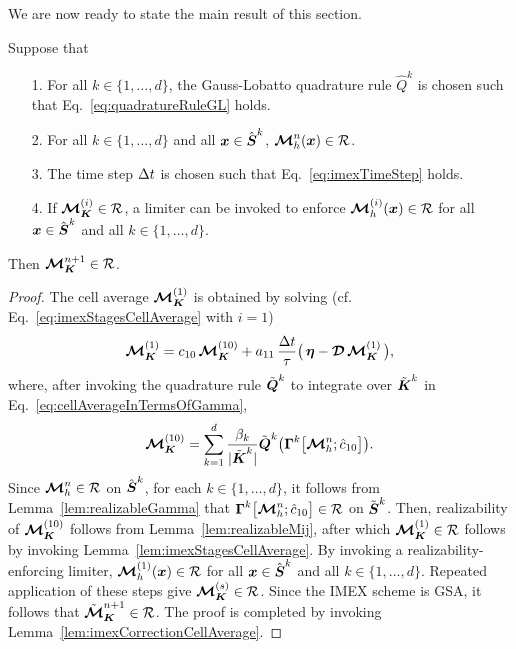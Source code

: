 We are now ready to state the main result of this section.  
\begin{theorem}
  Suppose that
  \begin{itemize}
    \item[1.] For all $k\in\{1,\ldots,d\}$, the Gauss-Lobatto quadrature rule $\hat{Q}^{k}$ is chosen such that Eq.~\eqref{eq:quadratureRuleGL} holds.  
    \item[2.] For all $k\in\{1,\ldots,d\}$ and all $\boldsymbol{x}\in\hat{\boldsymbol{S}}^{k}$, $\boldsymbol{\mathcal{M}}_{h}^{n}(\boldsymbol{x})\in\mathcal{R}$.
    \item[3.] The time step $\Delta t$ is chosen such that Eq.~\eqref{eq:imexTimeStep} holds.  
    \item[4.] If $\boldsymbol{\mathcal{M}}_{\boldsymbol{K}}^{(i)}\in\mathcal{R}$, a limiter can be invoked to enforce $\boldsymbol{\mathcal{M}}_{h}^{(i)}(\boldsymbol{x})\in\mathcal{R}$ for all $\boldsymbol{x}\in\hat{\boldsymbol{S}}^{k}$ and all $k\in\{1,\ldots,d\}$.
  \end{itemize}
  Then $\boldsymbol{\mathcal{M}}_{\boldsymbol{K}}^{n+1}\in\mathcal{R}$.  
  \label{the:realizableDGIMEX}
\end{theorem}
\begin{proof}
  The cell average $\boldsymbol{\mathcal{M}}_{\boldsymbol{K}}^{(1)}$ is obtained by solving (cf. Eq.~\eqref{eq:imexStagesCellAverage} with $i=1$)
  \begin{equation*}
    \boldsymbol{\mathcal{M}}_{\boldsymbol{K}}^{(1)}=c_{10}\,\boldsymbol{\mathcal{M}}_{\boldsymbol{K}}^{(10)}+a_{11}\,\frac{\Delta t}{\tau}\big(\,\boldsymbol{\eta}-\boldsymbol{\mathcal{D}}\,\boldsymbol{\mathcal{M}}_{\boldsymbol{K}}^{(1)}\,\big),
  \end{equation*}
  where, after invoking the quadrature rule $\tilde{\boldsymbol{Q}}^{k}$ to integrate over $\tilde{\boldsymbol{K}}^{k}$ in Eq.~\eqref{eq:cellAverageInTermsOfGamma},
  \begin{equation*}
    \boldsymbol{\mathcal{M}}_{\boldsymbol{K}}^{(10)}
    =\sum_{k=1}^{d}\frac{\beta_{k}}{|\tilde{\boldsymbol{K}}^{k}|}\tilde{\boldsymbol{Q}}^{k}\big(\boldsymbol{\Gamma}^{k}\big[\boldsymbol{\mathcal{M}}_{h}^{n};\hat{c}_{10}\big]\big).  
  \end{equation*}
  Since $\boldsymbol{\mathcal{M}}_{h}^{n}\in\mathcal{R}$ on $\hat{\boldsymbol{S}}^{k}$, for each $k\in\{1,\ldots,d\}$, it follows from Lemma~\ref{lem:realizableGamma} that $\boldsymbol{\Gamma}^{k}\big[\boldsymbol{\mathcal{M}}_{h}^{n};\hat{c}_{10}\big]\in\mathcal{R}$ on $\tilde{\boldsymbol{S}}^{k}$.  
  Then, realizability of $\boldsymbol{\mathcal{M}}_{\boldsymbol{K}}^{(10)}$ follows from Lemma~\ref{lem:realizableMij}, after which $\boldsymbol{\mathcal{M}}_{\boldsymbol{K}}^{(1)}\in\mathcal{R}$ follows by invoking Lemma~\ref{lem:imexStagesCellAverage}.  
  By invoking a realizability-enforcing limiter, $\boldsymbol{\mathcal{M}}_{h}^{(1)}(\boldsymbol{x})\in\mathcal{R}$ for all $\boldsymbol{x}\in\hat{\boldsymbol{S}}^{k}$ and all $k\in\{1,\ldots,d\}$.  
  Repeated application of these steps give $\boldsymbol{\mathcal{M}}_{\boldsymbol{K}}^{(s)}\in\mathcal{R}$.  
  Since the IMEX scheme is GSA, it follows that $\tilde{\boldsymbol{\mathcal{M}}}_{\boldsymbol{K}}^{n+1}\in\mathcal{R}$.  
  The proof is completed by invoking Lemma~\ref{lem:imexCorrectionCellAverage}.  
\end{proof}